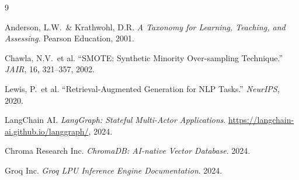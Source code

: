 \documentclass[12pt,a4paper]{article}
\begin{document}
\newpage
\begin{thebibliography}{9}

 Anderson, L.W.\ \& Krathwohl, D.R. \textit{A Taxonomy for Learning, 
Teaching, and Assessing}. Pearson Education, 2001.

 Chawla, N.V.\ et al. ``SMOTE: Synthetic Minority Over-sampling Technique.'' 
\textit{JAIR}, 16, 321--357, 2002.

 Lewis, P.\ et al. ``Retrieval-Augmented Generation for NLP Tasks.'' 
\textit{NeurIPS}, 2020.

 LangChain AI. \textit{LangGraph: Stateful Multi-Actor Applications}.
\url{https://langchain-ai.github.io/langgraph/}, 2024.

 Chroma Research Inc. \textit{ChromaDB: AI-native Vector Database}. 2024.

 Groq Inc. \textit{Groq LPU Inference Engine Documentation}. 2024.

\end{thebibliography}
\end{document}
